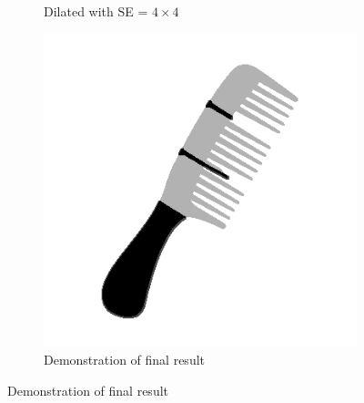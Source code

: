 \documentclass[a4paper]{article}
\begin{document}
\begin{figure}[htp]
\begin{subfigure}{.33\textwidth}
  \caption{Dilated with SE = $4 \times 4$}
  \label{fig:sub2}
\end{subfigure}
\begin{subfigure}{.33\textwidth}
  \centering
  \includegraphics[width=.9\linewidth]{ex4.7-weighted}
  \caption{Demonstration of final result}
  \label{fig:sub2}
\end{subfigure}
\captionsetup{format=empty}
\label{fig:test}
\end{figure}
\end{document}
